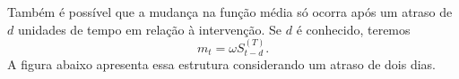 \documentclass[
  letterpaper,
  DIV=11,
  numbers=noendperiod]{scrartcl}
\theoremstyle{plain}
\theoremstyle{plain}
\theoremstyle{definition}
\theoremstyle{definition}
\theoremstyle{remark}
\begin{document}
\begin{figure}

\begin{minipage}[t]{\linewidth}

{\centering 


}

\end{minipage}%

\end{figure}

Também é possível que a mudança na função média só ocorra após um atraso
de \(d\) unidades de tempo em relação à intervenção. Se \(d\) é
conhecido, teremos \[m_t=\omega S_{t-d}^{(T)}.\] A figura abaixo
apresenta essa estrutura considerando um atraso de dois dias.
\end{document}

